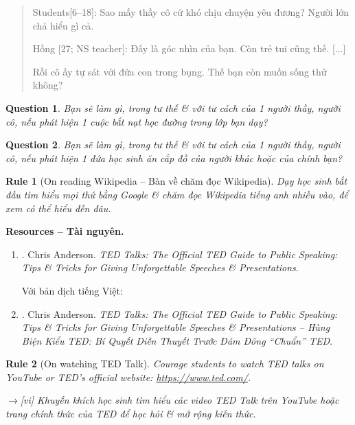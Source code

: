 \documentclass[12pt,twoside]{book}
\newtheorem{question}{Question}
\newtheorem{Rule}{Rule}
\begin{document}
\begin{quote}
	{\sf Students[6--18]}: Sao mấy thầy cô cứ khó chịu chuyện yêu đương? Người lớn chả hiểu gì cả.
	
	{\sf Hồng [27; NS teacher]}: Đấy là góc nhìn của bạn. Còn trẻ tui cũng thế. [...]
	
	Rồi cô ấy tự sát với đứa con trong bụng. Thế bạn còn muốn sống thử không?
\end{quote}

\begin{question}
	Bạn sẽ làm gì, trong tư thế \& với tư cách của 1 người thầy, người cô, nếu phát hiện 1 cuộc bắt nạt học đường trong lớp bạn dạy?
\end{question}

\begin{question}
	Bạn sẽ làm gì, trong tư thế \& với tư cách của 1 người thầy, người cô, nếu phát hiện 1 đứa học sinh ăn cắp đồ của người khác hoặc của chính bạn?
\end{question}

\begin{Rule}[On reading Wikipedia -- Bàn về chăm đọc Wikipedia]
	Dạy học sinh bắt đầu tìm hiểu mọi thứ bằng Google \& chăm đọc Wikipedia tiếng anh nhiều vào, để xem có thể hiểu đến đâu.
\end{Rule}

{\bf \textsf{Resources -- Tài nguyên.}}
\begin{enumerate}
	\item \cite{Anderson_TED}. {\sc Chris Anderson}. {\it TED Talks: The Official TED Guide to Public Speaking: Tips \& Tricks for Giving Unforgettable Speeches \& Presentations}.
	
	Với bản dịch tiếng Việt:
	\item \cite{Anderson_TED_VN}. {\sc Chris Anderson}. {\it TED Talks: The Official TED Guide to Public Speaking: Tips \& Tricks for Giving Unforgettable Speeches \& Presentations -- Hùng Biện Kiểu TED: Bí Quyết Diễn Thuyết Trước Đám Đông ``Chuẩn'' TED}.
\end{enumerate}

\begin{Rule}[On watching TED Talk]
	Courage students to watch TED talks on YouTube or TED's official website: \url{https://www.ted.com/}.
	
	{\sf[en]$\to$[vi]} Khuyến khích học sinh tìm hiểu các video TED Talk trên YouTube hoặc trang chính thức của TED để học hỏi \& mở rộng kiến thức.
\end{Rule}
\end{document}
